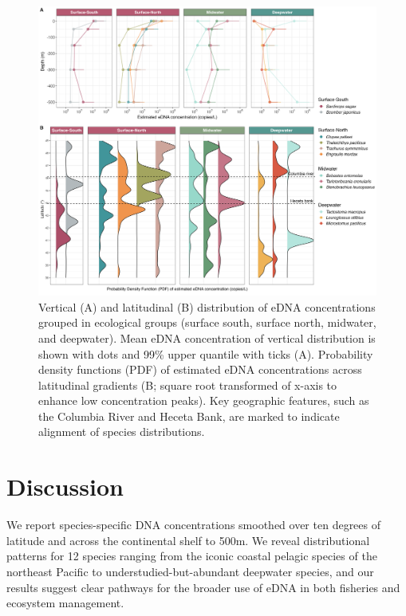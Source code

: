 \documentclass{article}
\begin{document}
\begin{figure}[tbhp]  
\centering
\includegraphics[width=16cm]{plots/4_Figure_4.jpg}  %
\caption{Vertical (A) and latitudinal (B) distribution of eDNA concentrations grouped in ecological groups (surface south, surface north, midwater, and deepwater). Mean eDNA concentration of vertical distribution is shown with dots and 99\% upper quantile with ticks (A). Probability density functions (PDF) of estimated eDNA concentrations across latitudinal gradients (B; square root transformed of x-axis to enhance low concentration peaks). Key geographic features, such as the Columbia River and Heceta Bank, are marked to indicate alignment of species distributions.}
\label{fig:fig4}
\end{figure}

\section*{Discussion}
We report species-specific DNA concentrations smoothed over ten degrees of latitude and across the continental shelf to 500m. We reveal distributional patterns for 12 species ranging from the iconic coastal pelagic species of the northeast Pacific to understudied-but-abundant deepwater species, and our results suggest clear pathways for the broader use of eDNA in both fisheries and ecosystem management.
\end{document}
